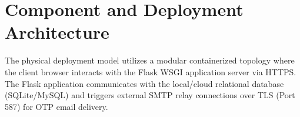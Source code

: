\section{Component and Deployment Architecture}
The physical deployment model utilizes a modular containerized topology where the client browser interacts with the Flask WSGI application server via HTTPS. The Flask application communicates with the local/cloud relational database (SQLite/MySQL) and triggers external SMTP relay connections over TLS (Port 587) for OTP email delivery.

